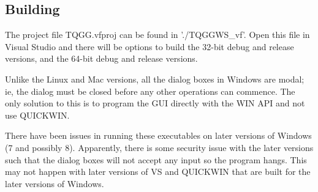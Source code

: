 \documentclass[10pt]{article}
\begin{document}
\subsection{Building}
The project file TQGG.vfproj can be found in './TQGGWS\_vf'. Open this file in Visual Studio
and there will be options to build the 32-bit debug and release versions, and the 64-bit debug 
and release versions.

Unlike the Linux and Mac versions, all the dialog boxes in Windows are modal; ie, the dialog must be 
closed before any other operations can commence. The only solution to this is to program the GUI
directly with the WIN API and not use QUICKWIN.

There have been issues in running these executables on later versions of Windows (7 and possibly 8).
Apparently, there is some security issue with the later versions such that the dialog boxes will
not accept any input so the program hangs. This may not happen with later versions of VS and QUICKWIN that
are built for the later versions of Windows.
\end{document}
